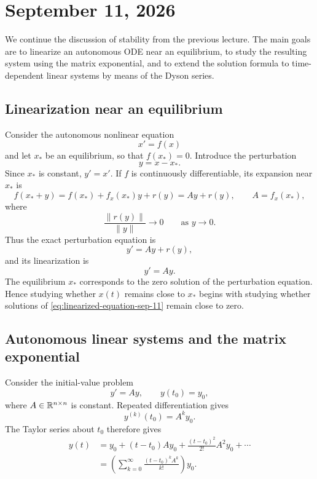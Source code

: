 \section{September 11, 2026}

We continue the discussion of stability from the previous lecture. The
main goals are to linearize an autonomous ODE near an equilibrium, to
study the resulting system using the matrix exponential, and to extend
the solution formula to time-dependent linear systems by means of the
Dyson series.

\subsection{Linearization near an equilibrium}

Consider the autonomous nonlinear equation
\begin{equation}\label{eq:nonlinear-autonomous-sep-11}
  x'=f(x)
\end{equation}
and let \(x_*\) be an equilibrium, so that \(f(x_*)=0\). Introduce the
perturbation
\[
  y=x-x_*.
\]
Since \(x_*\) is constant, \(y'=x'\). If \(f\) is continuously
differentiable, its expansion near \(x_*\) is
\[
  f(x_*+y)=f(x_*)+f_x(x_*)y+r(y)
           =Ay+r(y),
  \qquad
  A=f_x(x_*),
\]
where
\[
  \frac{\lVert r(y)\rVert}{\lVert y\rVert}\longrightarrow0
  \qquad\text{as }y\to0.
\]
Thus the exact perturbation equation is
\begin{equation}\label{eq:perturbation-equation-sep-11}
  y'=Ay+r(y),
\end{equation}
and its linearization is
\begin{equation}\label{eq:linearized-equation-sep-11}
  y'=Ay.
\end{equation}
The equilibrium \(x_*\) corresponds to the zero solution of the
perturbation equation. Hence studying whether \(x(t)\) remains close to
\(x_*\) begins with studying whether solutions of
\eqref{eq:linearized-equation-sep-11} remain close to zero.

\subsection{Autonomous linear systems and the matrix exponential}

Consider the initial-value problem
\begin{equation}\label{eq:linear-autonomous-sep-11}
  y'=Ay,
  \qquad
  y(t_0)=y_0,
\end{equation}
where \(A\in\mathbb{R}^{n\times n}\) is constant. Repeated differentiation
gives
\[
  y^{(k)}(t_0)=A^ky_0.
\]
The Taylor series about \(t_0\) therefore gives
\begin{align*}
  y(t)
  &=y_0+(t-t_0)Ay_0
    +\frac{(t-t_0)^2}{2!}A^2y_0+\cdots\\
  &=\left(\sum_{k=0}^{\infty}
    \frac{(t-t_0)^kA^k}{k!}\right)y_0.
\end{align*}

